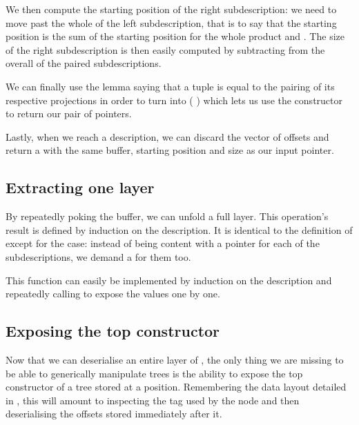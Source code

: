 We then compute the starting position of the right subdescription: we need to
move past the whole of the left subdescription, that is to say that the starting
position is the sum of the starting position for the whole product and .
%
The size of the right subdescription is then easily computed by subtracting
 from the overall  of the paired subdescriptions.

We can finally use the lemma  saying that a tuple
is equal to the pairing of its respective projections
in order to turn  into
(  \IdrisData{\#}  )
which lets us use the  constructor \IdrisData{(\#)} to return our
pair of pointers.


Lastly, when we reach a  description, we can discard the
vector of offsets and return a  with the same buffer,
starting position and size as our input pointer.

\subsection{Extracting one layer}

By repeatedly poking the buffer, we can unfold a full layer.
This operation's result is defined by induction
on the description. It is identical to the definition of
 except for the  case:
instead of being content with a pointer for each of the
subdescriptions, we demand a  for them too.


This function can easily be implemented by induction on the description
and repeatedly calling  to expose the values one by
one.


\subsection{Exposing the top constructor}

Now that we can deserialise an entire layer of ,
the only thing we are missing to be able to generically manipulate trees
is the ability to expose the top constructor of a tree stored at a
 position.
%
Remembering the data layout detailed in , this will
amount to inspecting the tag used by the node and then deserialising the
offsets stored immediately after it.

